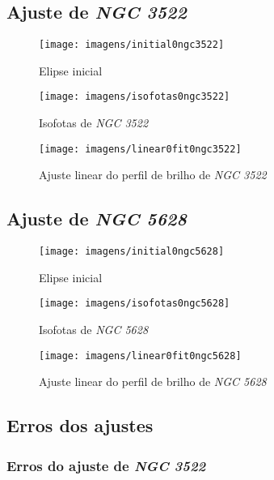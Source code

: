 \documentclass[a4paper, 11pt, fleqn, leqno]{article}
\begin{document}
\subsection{Ajuste de \textit{NGC 3522}}

\begin{figure}[H]
	\centering
	\texttt{[image: imagens/initial0ngc3522]}
	\caption{Elipse inicial}
\end{figure}

\begin{figure}[H]
	\centering
	\texttt{[image: imagens/isofotas0ngc3522]}
	\caption{Isofotas de \textit{NGC 3522}}
\end{figure}

\begin{figure}[H]
	\centering
	\texttt{[image: imagens/linear0fit0ngc3522]}
	\caption{Ajuste linear do perfil de brilho de \textit{NGC 3522}}
\end{figure}

\newpage
\subsection{Ajuste de \textit{NGC 5628}}

\begin{figure}[H]
	\centering
	\texttt{[image: imagens/initial0ngc5628]}
	\caption{Elipse inicial}
\end{figure}

\begin{figure}[H]
	\centering
	\texttt{[image: imagens/isofotas0ngc5628]}
	\caption{Isofotas de \textit{NGC 5628}}
\end{figure}

\begin{figure}[H]
	\centering
	\texttt{[image: imagens/linear0fit0ngc5628]}
	\caption{Ajuste linear do perfil de brilho de \textit{NGC 5628}}
\end{figure}

\newpage
\subsection{Erros dos ajustes}


\subsubsection{Erros do ajuste de \textit{NGC 3522}}
\end{document}
